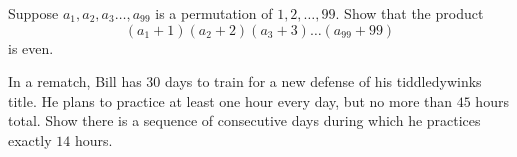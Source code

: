 \begin{prob}
Suppose $a_{1}, a_{2}, a_{3}\ldots,a_{99}$ is a permutation of $1,2,\ldots,99$. Show that the product
\[
(a_{1}+1)(a_{2}+2)(a_{3}+3) \dots(a_{99}+99)
\]
is even.
\end{prob}

\begin{prob}
In a rematch, Bill has $30$ days to train for a new defense of his tiddledywinks title. He plans to practice at least one hour
every day, but no more than $45$ hours total. Show there is a sequence of consecutive days during which he practices 
exactly $14$ hours. 
\end{prob}


